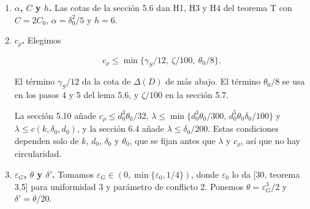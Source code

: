 \documentclass[spanish,11pt,a4paper]{article}
\providecommand{\tightlist}{\setlength{\itemsep}{0pt}\setlength{\parskip}{0pt}}
\begin{document}
\begin{enumerate}
  \[\lambda\le\min\Big\{\frac{\gamma_S}{36},\ \frac{\delta_0}{18(J+1)},\ \frac{\theta_0\delta_0}{200},\ \sqrt{\frac{\zeta}{40(J+B)}}\Big\},\]

  y ponemos \(\eta_T=\lambda^2/256\). Los cuatro términos se usan así.

  \begin{itemize}
  \tightlist
  \item
    \(\gamma_S/36\) da \(\Delta(E_X)\le9\lambda m\le\gamma_S m/4\) en la cota de \(\Delta(D\cup E_X)\) de más abajo.
  \item
    \(\delta_0/(18(J+1))\) es el presupuesto de vértices de los depósitos de intercambio {[}10, §4.1{]}: cada coordenada independiente usa sus propios depósitos, de modo que la unión de las huellas tiene grado máximo a lo sumo \(9p_X\).
  \item
    \(\theta_0\delta_0/200\) acota las exclusiones causadas por \(E_X\) en los pasos 4 y 5 del lema 5.6; implica \(\lambda\le\theta_0/72\).
  \item
    \(\sqrt{\zeta/(40(J+B))}\) mantiene el residuo centrado del lema 5.10 dentro de su margen: las mitades altas contienen a lo sumo \(9Jp_X^2\) bloques de cada tipo, y el desplazamiento \(s_i/2\le p_X^2/2\) se extiende con entradas de a lo sumo \(Bp_X^2/2\).
  \end{itemize}

  En las secciones 5.8--5.10 y 6, \(J\) y \(B\) son los de la sección correspondiente.
\item
  \textbf{\(\alpha\), \(C\) y \(h\).} Las cotas de la sección 5.6 dan H1, H3 y H4 del teorema T con \(C=2C_0\), \(\alpha=\delta_0^2/5\) y \(h=6\).
\item
  \textbf{\(c_\rho\).} Elegimos

  \[c_\rho\le\min\{\gamma_S/12,\ \zeta/100,\ \theta_0/8\}.\]

  El término \(\gamma_S/12\) da la cota de \(\Delta(D)\) de más abajo. El término \(\theta_0/8\) se usa en los pasos 4 y 5 del lema 5.6, y \(\zeta/100\) en la sección 5.7.

  La sección 5.10 añade \(c_\rho\le d_0^3\theta_0/32\), \(\lambda\le\min\{d_0^3\theta_0/300,\,d_0^5\theta_0\delta_0/100\}\) y \(\lambda\le c(k,\delta_0,d_0)\), y la sección 6.4 añade \(\lambda\le\delta_0/200\). Estas condiciones dependen solo de \(k\), \(d_0\), \(\delta_0\) y \(\theta_0\), que se fijan antes que \(\lambda\) y \(c_\rho\), así que no hay circularidad.
\item
  \textbf{\(\varepsilon_G\), \(\theta\) y \(\delta'\).} Tomamos \(\varepsilon_G\in(0,\min\{\varepsilon_0,1/4\})\), donde \(\varepsilon_0\) lo da {[}30, teorema 3.5{]} para uniformidad 3 y parámetro de conflicto 2. Ponemos \(\theta=\varepsilon_G^3/2\) y \(\delta'=\theta/20\).
\end{enumerate}
\end{document}
